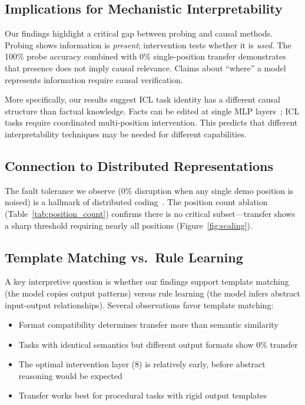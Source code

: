 \documentclass[runningheads]{llncs}
\begin{document}
\subsection{Implications for Mechanistic Interpretability}

Our findings highlight a critical gap between probing and causal methods. Probing shows information is \emph{present}; intervention tests whether it is \emph{used}. The 100\% probe accuracy combined with 0\% single-position transfer demonstrates that presence does not imply causal relevance. Claims about ``where'' a model represents information require causal verification.

More specifically, our results suggest ICL task identity has a different causal structure than factual knowledge. Facts can be edited at single MLP layers~\cite{meng2022locating}; ICL tasks require coordinated multi-position intervention. This predicts that different interpretability techniques may be needed for different capabilities.

\subsection{Connection to Distributed Representations}

The fault tolerance we observe (0\% disruption when any single demo position is noised) is a hallmark of distributed coding~\cite{hinton1986distributed}. The position count ablation (Table~\ref{tab:position_count}) confirms there is no critical subset---transfer shows a sharp threshold requiring nearly all positions (Figure~\ref{fig:scaling}).

\subsection{Template Matching vs.\ Rule Learning}

A key interpretive question is whether our findings support template matching (the model copies output patterns) versus rule learning (the model infers abstract input-output relationships). Several observations favor template matching:

\begin{itemize}
    \item Format compatibility determines transfer more than semantic similarity
    \item Tasks with identical semantics but different output formats show 0\% transfer
    \item The optimal intervention layer (8) is relatively early, before abstract reasoning would be expected
    \item Transfer works best for procedural tasks with rigid output templates
\end{itemize}
\end{document}
